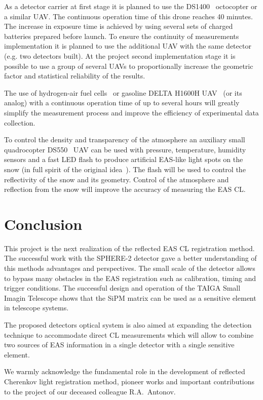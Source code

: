 \documentclass[a4paper,11pt]{article}
\begin{document}
As a detector carrier at first stage it is planned to use  the DS1400~\cite{dronestroy} octocopter or a similar UAV.
The continuous operation time of this drone reaches 40 minutes.
The increase in exposure time is achieved by using several sets of charged batteries prepared before launch. 
To ensure the continuity of measurements implementation it is planned to use the additional UAV with the same detector (e.g. two detectors built).
At the project second implementation stage it is possible to use a group of several UAVs to proportionally increase the geometric factor and statistical reliability of the results. 

The use of hydrogen-air fuel cells~\cite{UAVair} or gasoline DELTA H1600H UAV~\cite{UAVoil} (or its analog) with a continuous operation time of up to several hours will greatly simplify the measurement process and improve the efficiency of experimental data collection.

To control the density and transparency of the atmosphere an auxiliary small quadrocopter DS550~\cite{dronestroy} UAV can be used with pressure, temperature, humidity sensors and a fast LED flash to produce artificial EAS-like light spots on the snow (in full spirit of the original idea~\cite{Chu74}).
The flash will be used to control the reflectivity of the snow and its geometry. Control of the atmosphere and reflection from the snow will improve the accuracy of measuring the EAS CL.

\section{Conclusion}

This project is the next realization of the reflected EAS CL registration method. The successful work with the SPHERE-2 detector gave a better understanding of this methods advantages and perspectives. The small scale of the detector allows to bypass many obstacles in the EAS registration such as calibration, timing and trigger conditions. The successful design and operation of the TAIGA Small Imagin Telescope shows that the SiPM matrix can be used as a sensitive element in telescope systems.

The proposed detectors optical system is also aimed at expanding the detection technique to accommodate direct CL measurements which will allow to combine two sources of EAS information in a single detector with a single sensitive element.


\acknowledgments
We warmly acknowledge the fundamental role in the development of reflected Cherenkov light registration method, pioneer works and important contributions to the project of our deceased colleague R.A.~Antonov.
\end{document}
